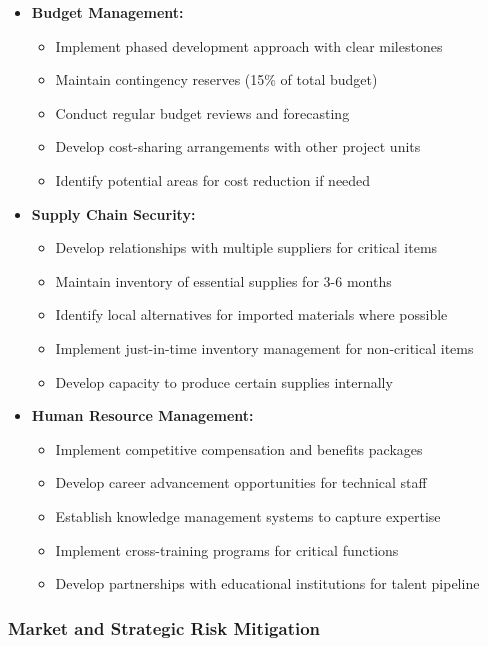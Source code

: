 \begin{itemize}
    \item \textbf{Budget Management:}
    \begin{itemize}
        \item Implement phased development approach with clear milestones
        \item Maintain contingency reserves (15\% of total budget)
        \item Conduct regular budget reviews and forecasting
        \item Develop cost-sharing arrangements with other project units
        \item Identify potential areas for cost reduction if needed
    \end{itemize}
    
    \item \textbf{Supply Chain Security:}
    \begin{itemize}
        \item Develop relationships with multiple suppliers for critical items
        \item Maintain inventory of essential supplies for 3-6 months
        \item Identify local alternatives for imported materials where possible
        \item Implement just-in-time inventory management for non-critical items
        \item Develop capacity to produce certain supplies internally
    \end{itemize}
    
    \item \textbf{Human Resource Management:}
    \begin{itemize}
        \item Implement competitive compensation and benefits packages
        \item Develop career advancement opportunities for technical staff
        \item Establish knowledge management systems to capture expertise
        \item Implement cross-training programs for critical functions
        \item Develop partnerships with educational institutions for talent pipeline
    \end{itemize}
\end{itemize}

\subsubsection{Market and Strategic Risk Mitigation}

